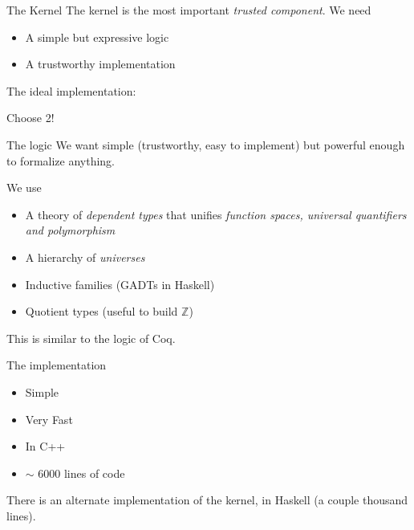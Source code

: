 \documentclass{beamer}
\begin{document}
\begin{frame}{The Kernel}
  The kernel is the most important \emph{trusted component}. We need
  \begin{itemize}
  \item A simple but expressive logic
  \item A trustworthy implementation
  \end{itemize}
  The ideal implementation:

  \begin{center}
  \end{center}


  Choose 2!
\end{frame}

\begin{frame}{The logic}
  We want simple (trustworthy, easy to implement) but powerful enough
  to formalize anything.
  \begin{block}{We use}
    \begin{itemize}
    \item A theory of \emph{dependent types} that unifies \emph{function
      spaces, universal quantifiers and polymorphism}
    \item A hierarchy of \emph{universes}
    \item Inductive families (GADTs in Haskell)
    \item Quotient types (useful to build $\mathbb{Z}$)
    \end{itemize}
  \end{block}
  This is similar to the logic of Coq.
\end{frame}

\begin{frame}{The implementation}
  \begin{itemize}
  \item Simple
  \item Very Fast
  \item In C++
  \item $\sim$ 6000 lines of code
  \end{itemize}

  There is an alternate implementation of the kernel, in Haskell (a
  couple thousand lines).
\end{frame}
\end{document}
